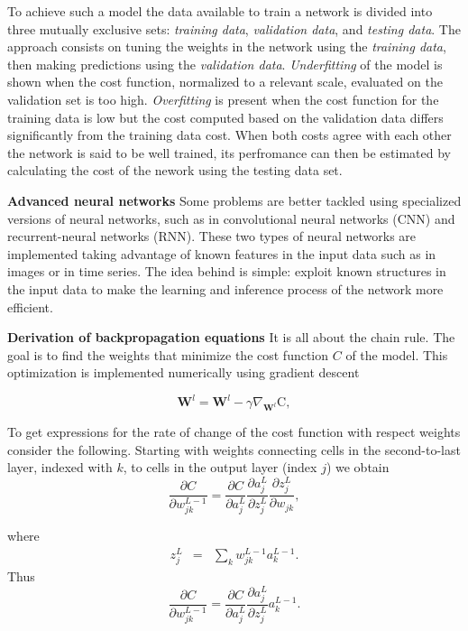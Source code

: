 \documentclass[11pt,onecolumn]{article}
\begin{document}
To achieve such a model the data available to train a network is divided into three mutually exclusive sets: 
\emph{training data}, \emph{validation data}, and \emph{testing data}. 
The approach consists on tuning the weights in the 
network using the \emph{training data}, then making predictions using the \emph{validation data}. 
\emph{Underfitting} of the model is shown when the cost function, normalized to a relevant scale,  evaluated on the validation set 
is too high. 
\emph{Overfitting} is present when the cost function for the training data is low but the cost computed based on 
the validation data differs significantly from the training data cost. 
When both costs agree with each other the network is said to be well trained, its perfromance can then be 
estimated by calculating the cost of the nework using the testing data set. 

\textbf{Advanced neural networks}
Some problems are better tackled using specialized versions of neural networks, such as in convolutional 
neural networks (CNN) and recurrent-neural networks (RNN). These two types of neural networks are 
implemented taking advantage of known features in the input data such as in images or in time series. 
The idea behind is simple: exploit known structures in the input data to make the learning and inference 
process of the network more efficient.

\textbf{Derivation of backpropagation equations} It is all about the chain rule. The goal is to find
the weights that minimize the cost function $C$ of the model. This optimization is implemented numerically 
using gradient descent 

\begin{equation}
	\mathbf{W}^{l} = \mathbf{W}^{l} - \gamma \nabla_{\mathbf{W}^{l}} \mathrm{C},
\end{equation}

To get expressions for the rate of change of the cost function with respect weights consider the following.
Starting with weights connecting cells in the second-to-last layer, indexed with $k$, to cells in the output 
layer (index $j$) we obtain 
\begin{equation}
    \frac{\partial C}{\partial w^{L-1}_{jk}} =  \frac{\partial C}{\partial a^{L}_j} 
                                               \frac{\partial a^{L}_j}{\partial z^{L}_j}
                                               \frac{\partial z^{L}_j}{\partial w_{jk} },
\end{equation}

where 
\begin{eqnarray}
    z^{L}_j &=& \sum_k w_{jk}^{L-1} a^{L-1}_k. 
\end{eqnarray}  
Thus 
\begin{equation}
    \frac{\partial C}{\partial w^{L-1}_{jk}} =  \frac{\partial C}{\partial a^{L}_j} 
                                               \frac{\partial a^{L}_j}{\partial z^{L}_j}
                                               a^{L-1}_k.
\end{equation}
\end{document}
